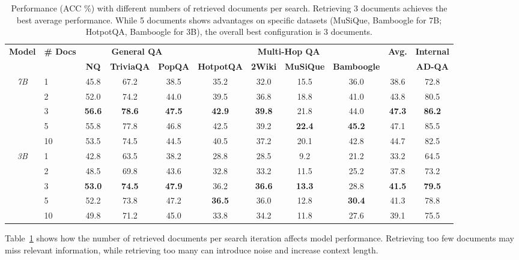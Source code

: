 \documentclass[11pt]{article}
\begin{document}
\begin{table}[h]
\centering
\small
\begin{tabular}{cl|ccc|cccc|c|c}
\toprule
\multirow{2}{*}{\textbf{Model}} & \multirow{2}{*}{\textbf{\# Docs}} & \multicolumn{3}{c|}{\textbf{General QA}} & \multicolumn{4}{c|}{\textbf{Multi-Hop QA}} & \multirow{2}{*}{\textbf{Avg.}} & \textbf{Internal} \\
& & \textbf{NQ} & \textbf{TriviaQA} & \textbf{PopQA} & \textbf{HotpotQA} & \textbf{2Wiki} & \textbf{MuSiQue} & \textbf{Bamboogle} & & \textbf{AD-QA} \\
\midrule
\multirow{5}{*}{\textit{7B}} 
& 1 & 45.8 & 67.2 & 38.5 & 35.2 & 32.0 & 15.5 & 36.0 & 38.6 & 72.8 \\
& 2 & 52.0 & 74.2 & 44.0 & 39.5 & 36.8 & 18.8 & 41.0 & 43.8 & 80.5 \\
& 3 & \textbf{56.6} & \textbf{78.6} & \textbf{47.5} & \textbf{42.9} & \textbf{39.8} & 21.8 & 44.0 & \textbf{47.3} & \textbf{86.2} \\
& 5 & 55.8 & 77.8 & 46.8 & 42.5 & 39.2 & \textbf{22.4} & \textbf{45.2} & 47.1 & 85.5 \\
& 10 & 53.5 & 74.5 & 44.5 & 40.5 & 37.2 & 20.1 & 42.8 & 44.7 & 82.5 \\
\midrule
\multirow{5}{*}{\textit{3B}} 
& 1 & 42.8 & 63.5 & 38.2 & 28.8 & 28.5 & 9.2 & 21.2 & 33.2 & 64.5 \\
& 2 & 48.5 & 69.8 & 43.6 & 32.8 & 33.2 & 11.5 & 25.2 & 37.8 & 73.2 \\
& 3 & \textbf{53.0} & \textbf{74.5} & \textbf{47.9} & 36.2 & \textbf{36.6} & \textbf{13.3} & 28.8 & \textbf{41.5} & \textbf{79.5} \\
& 5 & 52.2 & 73.8 & 47.2 & \textbf{36.5} & 36.0 & 12.8 & \textbf{30.4} & 41.3 & 78.8 \\
& 10 & 49.8 & 71.2 & 45.0 & 33.8 & 34.2 & 11.8 & 27.6 & 39.1 & 75.5 \\
\bottomrule
\end{tabular}
\caption{Performance (ACC \%) with different numbers of retrieved documents per search. Retrieving 3 documents achieves the best average performance. While 5 documents shows advantages on specific datasets (MuSiQue, Bamboogle for 7B; HotpotQA, Bamboogle for 3B), the overall best configuration is 3 documents.}
\label{tab:num_docs}
\end{table}

Table~\ref{tab:num_docs} shows how the number of retrieved documents per search iteration affects model performance. Retrieving too few documents may miss relevant information, while retrieving too many can introduce noise and increase context length.
\end{document}
